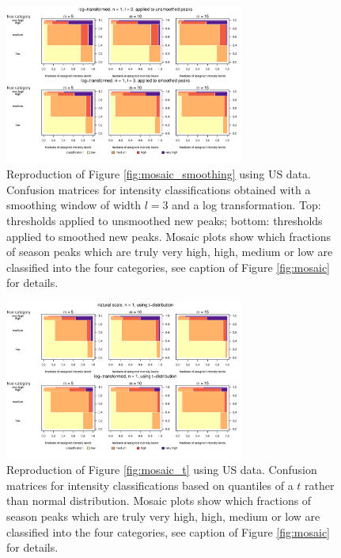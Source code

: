 \documentclass[12pt]{article}
\begin{document}
\begin{figure}
\begin{center}
\includegraphics[width=0.7\textwidth]{figure/mosaic_log_smoothed_us.pdf}
\end{center}
\caption{Reproduction of Figure \ref{fig:mosaic_smoothing} using US data. Confusion matrices for intensity classifications obtained with a smoothing window of width $l = 3$ and a log transformation. Top: thresholds applied to unsmoothed new peaks; bottom: thresholds applied to smoothed new peaks. Mosaic plots show which fractions of season peaks which are truly very high, high, medium or low are classified into the four categories, see caption of Figure \ref{fig:mosaic} for details.}
\label{fig:mosaic_smoothing_us}
\end{figure}



\begin{figure}[h!]
\begin{center}
\includegraphics[width=0.7\textwidth]{figure/mosaic_t_fr.pdf}

\caption{Reproduction of Figure \ref{fig:mosaic_t} using US data. Confusion matrices for intensity classifications based on quantiles of a $t$ rather than normal distribution. Mosaic plots show which fractions of season peaks which are truly very high, high, medium or low are classified into the four categories, see caption of Figure \ref{fig:mosaic} for details.}
\label{fig:mosaic_t_us}
\end{center}
\end{figure}
\end{document}
